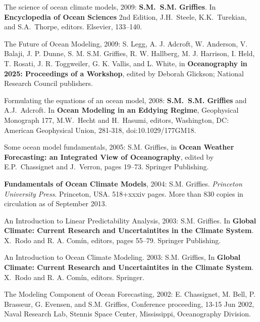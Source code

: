 \begin{etaremune}
\item The science of ocean climate models, 2009: {\bf S.M.\
    S.M. Grif\/f\/ies}.  In {\bf Encyclopedia of Ocean Sciences} 2nd
  Edition,  J.H.\ Steele, K.K.\ Turekian, and S.A.\ Thorpe, editors.
  Elsevier, 133--140.

\item The Future of Ocean Modeling, 2009: S. Legg, A. J. Adcroft, W.
  Anderson, V. Balaji, J. P. Dunne, S. M. S.M. Grif\/f\/ies,
  R. W. Hallberg, M. J. Harrison, I. Held, T. Rosati,
  J. R. Toggweiler, G. K. Vallis, and L.  White, in {\bf Oceanography
  in 2025: Proceedings of a Workshop}, edited by Deborah Glickson;
  National Research Council publishers.  

\item Formulating the equations of an ocean model, 2008: {\bf S.M.\
    S.M. Grif\/f\/ies} and A.J.\ Adcroft. In {\bf Ocean Modeling in an
    Eddying Regime}, Geophysical Monograph 177, M.W.\ Hecht and H.\
  Hasumi, editors, Washington, DC: American Geophysical Union,
  281-318, doi:10.1029/177GM18. 

\item Some ocean model fundamentals, 2005: S.M. Grif\/f\/ies, in {\bf
Ocean Weather Forecasting: an Integrated View of Oceanography}, edited
by E.P.\ Chassignet and J.\ Verron, pages 19--73.  Springer
Publishing.

\item {\bf Fundamentals of Ocean Climate Models}, 2004: S.M. Grif\/f\/ies. {\em Princeton University Press}. Princeton,
  USA.  518+xxxiv pages.  More than 830 copies in circulation as of
  September 2013.

\item An Introduction to Linear Predictability Analysis, 2003: S.M. Grif\/f\/ies.  In {\bf Global Climate: Current Research and
    Uncertaintites in the Climate System}. X.\ Rodo and R. A. Com\'in,
  editors, pages 55--79.  Springer Publishing.

\item An Introduction to Ocean Climate Modeling.  2003: S.M. Grif\/f\/ies, In {\bf Global Climate: Current Research and
Uncertaintites in the Climate System}. X.\ Rodo and R. A. Com\'in,
editors.  Springer.

\item The Modeling Component of Ocean Forecasting, 2002:
  E. Chassignet, M. Bell, P. Brasseur, G. Evensen, and S.M. Grif\/f\/ies, Conference proceeding, 13-15 Jun 2002, Naval
  Research Lab, Stennis Space Center, Mississippi, Oceanography
  Division.


\end{etaremune}
